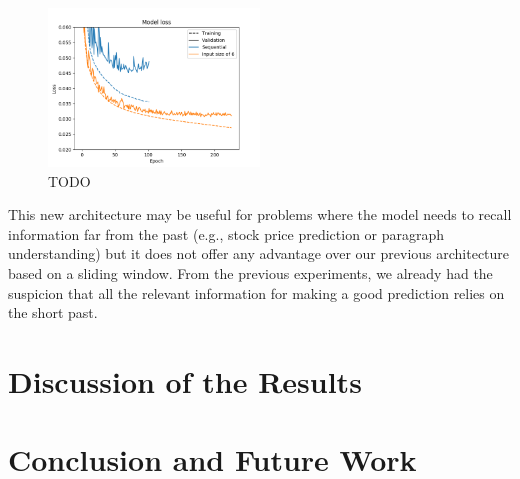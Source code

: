 \documentclass[]{article}
\begin{document}
\begin{figure}[H]
	\centering
	\includegraphics[width=0.5\textwidth]{architecture2}
	\caption{TODO}
	\label{f:architecture2}
\end{figure}

This new architecture may be useful for problems where the model needs to recall information far from the past (e.g., stock price prediction or paragraph understanding) but it does not offer any advantage over our previous architecture based on a sliding window. From the previous experiments, we already had the suspicion that all the relevant information for making a good prediction relies on the short past.

\section{Discussion of the Results}

\section{Conclusion and Future Work}
\end{document}
